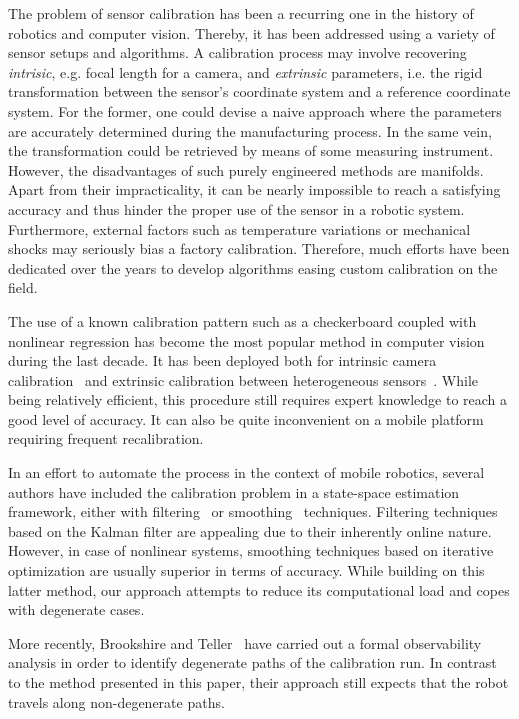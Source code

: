 The problem of sensor calibration has been a recurring one in the history of
robotics and computer vision. Thereby, it has been addressed using a
variety of sensor setups and algorithms. A calibration process may involve
recovering \emph{intrisic}, e.g. focal length for a camera, and \emph{extrinsic}
parameters, i.e. the rigid transformation between the sensor's coordinate system
and a reference coordinate system. For the former, one could devise a naive
approach where the parameters are accurately determined during the manufacturing
process. In the same vein, the transformation could be retrieved by means of
some measuring instrument. However, the disadvantages of such purely
engineered methods are manifolds. Apart from their impracticality, it can be
nearly impossible to reach a satisfying accuracy and thus hinder the proper use
of the sensor in a robotic system. Furthermore, external factors such as
temperature variations or mechanical shocks may seriously bias a factory
calibration. Therefore, much efforts have been dedicated over the years to
develop algorithms easing custom calibration on the field.

The use of a known calibration pattern such as a checkerboard coupled with
nonlinear regression has become the most popular method in computer vision
during the last decade. It has been deployed both for intrinsic camera
calibration~\cite{sturm99plane} and extrinsic calibration
between heterogeneous sensors~\cite{zhang04extrinsic}. While being relatively
efficient, this procedure still requires expert knowledge to reach a good level
of accuracy. It can also be quite inconvenient on a mobile platform requiring
frequent recalibration.

In an effort to automate the process in the context of mobile robotics, several
authors have included the calibration problem in a state-space estimation
framework, either with filtering~\cite{martinelli06automatic} or
smoothing~\cite{kuemmerle11simultaneous} techniques. Filtering techniques based
on the Kalman filter are appealing due to their inherently online nature.
However, in case of nonlinear systems, smoothing techniques based on iterative
optimization are usually superior in terms of accuracy. While building on this
latter method, our approach attempts to reduce its computational load and copes
with degenerate cases.

More recently, Brookshire and Teller~\cite{brookshire12extrinsic} have carried
out a formal observability analysis in order to identify degenerate paths of
the calibration run. In contrast to the method presented in this paper, their
approach still expects that the robot travels along non-degenerate paths.

